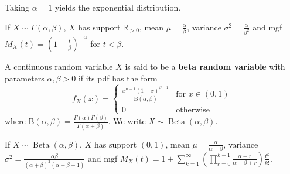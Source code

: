 Taking $\alpha=1$ yields the exponential distribution.

If $X\sim \Gamma(\alpha,\beta)$, $X$ has support $\mathbb R_{>0}$, mean $\mu=\frac{\alpha}{\beta}$, variance $\sigma^2=\frac{\alpha}{\beta^2}$ and mgf $M_X(t)=\left(1 - \frac{t}{\beta}\right)^{-\alpha}$ for $t < \beta$.


\begin{definition}
	A continuous random variable $X$ is said to be a \textbf{beta random variable} with parameters $\alpha,\beta>0$ if its pdf has the form
	$$f_X(x)=\begin{cases}
		\frac{x^{\alpha-1}(1-x)^{\beta-1}} {\mathrm{B}(\alpha,\beta)} & \text{for $x\in(0,1)$}\\
		0 & \text{otherwise}
	\end{cases}$$
	where $\mathrm{B}(\alpha,\beta) = \frac{\Gamma(\alpha)\Gamma(\beta)}{\Gamma(\alpha + \beta)}$. We write $X\sim \operatorname{Beta}(\alpha,\beta)$.
\end{definition}

If $X\sim \operatorname{Beta}(\alpha,\beta)$, $X$ has support $(0,1)$, mean $\mu=\frac{\alpha}{\alpha + \beta}$, variance $\sigma^2=\frac{\alpha\beta}{(\alpha+\beta)^2(\alpha+\beta+1)}$ and mgf $M_X(t)=1+\sum_{k=1}^{\infty} \left( \prod_{r=0}^{k-1} \frac{\alpha+r}{\alpha+\beta+r} \right) \frac{t^k}{k!}$.
